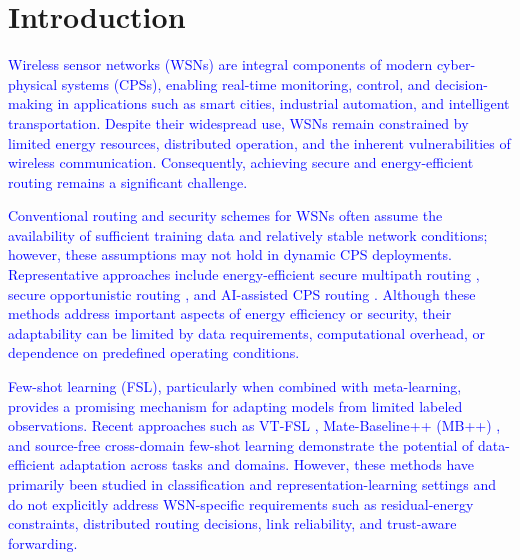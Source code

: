 \documentclass[pdflatex,sn-mathphys-num]{sn-jnl}
\begin{document}

\maketitle


\section{Introduction}
\label{sec:introduction}

\textcolor{blue}{Wireless sensor networks (WSNs) are integral components of modern cyber-physical systems (CPSs), enabling real-time monitoring, control, and decision-making in applications such as smart cities, industrial automation, and intelligent transportation. Despite their widespread use, WSNs remain constrained by limited energy resources, distributed operation, and the inherent vulnerabilities of wireless communication. Consequently, achieving secure and energy-efficient routing remains a significant challenge.}

\textcolor{blue}{Conventional routing and security schemes for WSNs often assume the availability of sufficient training data and relatively stable network conditions; however, these assumptions may not hold in dynamic CPS deployments. Representative approaches include energy-efficient secure multipath routing \cite{biswas2023eesm}, secure opportunistic routing \cite{narayana2026secure}, and AI-assisted CPS routing \cite{wong2025sustainable}. Although these methods address important aspects of energy efficiency or security, their adaptability can be limited by data requirements, computational overhead, or dependence on predefined operating conditions.}

\textcolor{blue}{Few-shot learning (FSL), particularly when combined with meta-learning, provides a promising mechanism for adapting models from limited labeled observations. Recent approaches such as VT-FSL \cite{li2026vtfsl}, Mate-Baseline++ (MB++) \cite{zhou2026mate}, and source-free cross-domain few-shot learning \cite{zhang2026cdfsl,zhang2026trap} demonstrate the potential of data-efficient adaptation across tasks and domains. However, these methods have primarily been studied in classification and representation-learning settings and do not explicitly address WSN-specific requirements such as residual-energy constraints, distributed routing decisions, link reliability, and trust-aware forwarding.}
\end{document}
